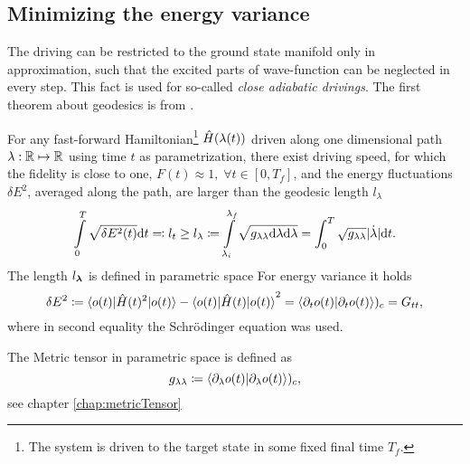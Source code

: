 






\subsection{Minimizing the energy variance}
The driving can be restricted to the ground state manifold only in approximation, such that the excited parts of wave-function can be neglected in every step. This fact is used for so-called \emph{close adiabatic drivings}. The first theorem about geodesics is from \cite{Bukov2019}.

\begin{thm}
    \label{thm:polkovnikov}
    For any fast-forward Hamiltonian\footnote{The system is driven to the target state in some fixed final time $T_f$.} $\hat{H}(\lambda(t))$ driven along one dimensional path $\lambda: \mathbb{R}\mapsto \mathbb{R}$ using time $t$ as parametrization, there exist driving speed, for which the fidelity is close to one, $F(t)\approx 1, \;\forall t\in[0,T_f]$, and the energy fluctuations $\delta E^2$, averaged along the path, are larger than the geodesic length $l_\lambda$
    \begin{equation}
        \int\limits_0^T\sqrt{\delta E^2(t)}\mathrm{d} t \eqqcolon l_t\geq l_\lambda \coloneqq \int\limits_{\lambda_i}^{\lambda_f} \sqrt{g_{\lambda\lambda}\mathrm{d} \lambda\mathrm{d} \lambda} =\int_0^T \sqrt{g_{\lambda\lambda}}|\dot \lambda|\mathrm{d} t.
    \end{equation}
    The length $l_{\bm\lambda}$ is defined in parametric space For energy variance it holds
    \begin{equation}
        \delta E^2\coloneqq \braket{o(t)|\hat{H}(t)^2|o(t)}-\braket{o(t)|\hat{H}(t)|o(t)}^2=\braket{\partial_t  o(t)|\partial_t o(t)})_c=G_{tt},
    \end{equation}    
    where in second equality the Schr\"odinger equation was used. 
    
    The Metric tensor in parametric space is defined as
    \begin{equation}
        g_{\lambda\lambda}\coloneqq \braket{\partial_\lambda o(t)|\partial_\lambda o(t)})_c,
    \end{equation}
    see chapter \ref{chap:metricTensor}
\end{thm}


